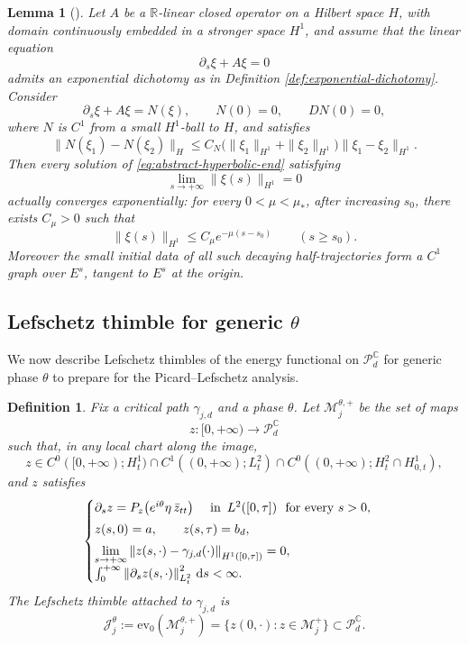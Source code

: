\documentclass[11pt]{amsart}
\theoremstyle{plain}
\newtheorem{lem}[thm]{Lemma}
\newtheorem{defn}[thm]{Definition}
\theoremstyle{definition}
\newcommand{\R}{\mathbb{R}}
\newcommand{\C}{\mathbb{C}}
\newcommand{\dd}{\mathrm d}
\newcommand{\ev}{\mathrm{ev}_0}
\newcommand{\Norm}[1]{\left\lVert #1\right\rVert}
\newcommand{\norm}[1]{\left\lVert #1\right\rVert}
\newcommand{\PP}{\mathcal{P}}
\begin{document}
\begin{lem}[\cite{Henry1981,PSS1997}]\label{lem:Lyapunov--Perron}Let $A$ be a $\R$-linear closed operator on a Hilbert space $H$, with
domain continuously embedded in a stronger space $H^1$, and assume that
the linear equation
\[
 \partial_s\xi+A\xi=0
\]
admits an exponential dichotomy as in Definition \ref{def:exponential-dichotomy}. Consider
\begin{equation}\label{eq:abstract-hyperbolic-end}
 \partial_s\xi+A\xi=N(\xi),
 \qquad
 N(0)=0,\qquad DN(0)=0,
\end{equation}
where $N$ is $C^1$ from a small $H^1$-ball to $H$, and satisfies
\[
 \|N(\xi_1)-N(\xi_2)\|_{H}
 \le
 C_N\bigl(\|\xi_1\|_{H^1}+\|\xi_2\|_{H^1}\bigr)
 \|\xi_1-\xi_2\|_{H^1}.
\]
Then every solution of \eqref{eq:abstract-hyperbolic-end} satisfying
\[
 \lim_{s\to+\infty}\|\xi(s)\|_{H^1}=0
\]
actually converges exponentially: for every $0<\mu<\mu_*$, after increasing
$s_0$, there exists $C_\mu>0$ such that
\[
 \|\xi(s)\|_{H^1}\le C_\mu e^{-\mu(s-s_0)}
 \qquad (s\ge s_0).
\]  
Moreover the small initial data of all such decaying
half-trajectories form a $C^1$ graph over $E^s$, tangent to $E^s$ at
the origin.
\end{lem}


\subsection{Lefschetz thimble for generic $\theta$} We now describe Lefschetz thimbles of the energy functional on $\mathcal{P}_d^{\C}$ for generic phase $\theta$ to prepare for the Picard–Lefschetz analysis. 

\begin{defn}\label{def:thimble}
Fix a critical path $\gamma_{j,d}$ and a phase $\theta$. Let $\mathcal M_j^{\theta,+}$ be the set of maps
\[
z:[0,+\infty)\longrightarrow \PP_d^{\C}
\]
such that, in any local chart along the image,
\[
z\in C^0([0,+\infty);H^1_t)\cap C^1((0,+\infty);L^2_t)\cap C^0((0,+\infty);H^2_t\cap H^1_{0,t}),
\]
and $z$ satisfies
\begin{equation}
\begin{cases}
\partial_s z=P_z\bigl(e^{i\theta}\eta\,\bar{z}_{tt}\bigr)
\quad\text{ in\, }L^2([0,\tau])~\text{ for every }s>0,
\\[0.1cm]
z(s,0)=a,
\qquad
z(s,\tau)=b_d,
\\[0.1cm]
\lim\limits_{s\to+\infty}\Norm{z(s,\cdot)-\gamma_{j,d}(\cdot)}_{H^1([0,\tau])}=0,
\\[0.1cm]
\int_0^{+\infty}\norm{\partial_s z(s,\cdot)}_{L^2_t}^2\,\dd s<\infty.
\end{cases}
\end{equation}
The Lefschetz thimble attached to $\gamma_{j,d}$ is
\begin{equation*}\label{eq:Jjdef}
\mathcal{J}_j^{\theta}:=\ev(\mathcal M_j^{\theta,+})
=\{z(0,\cdot): z\in \mathcal M_j^+\}\subset \PP_d^{\C}.
\end{equation*}
\end{defn}
\end{document}
